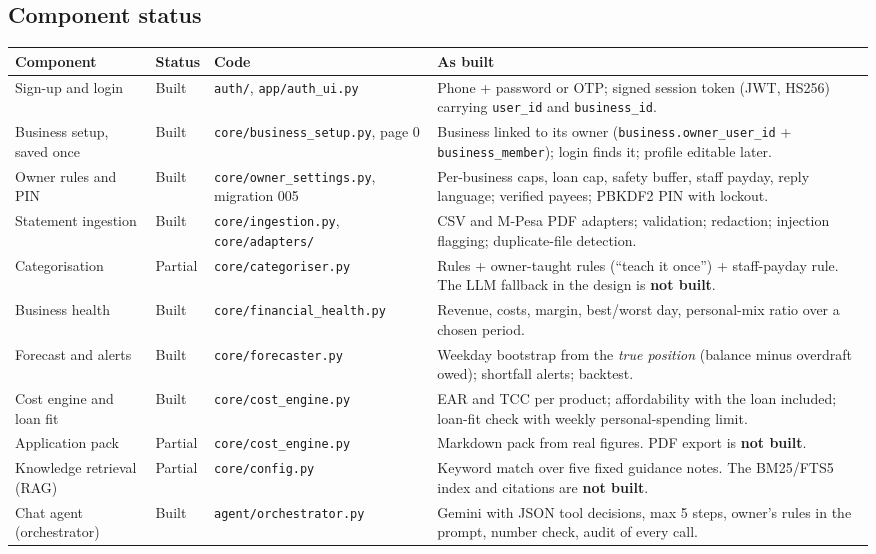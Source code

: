 \documentclass[10pt,a4paper]{article}
\newcommand{\code}[1]{\texttt{\small #1}}
\begin{document}
\subsection{Component status}
\begingroup\footnotesize
\begin{longtable}{@{}p{3.6cm}p{1.3cm}p{4.0cm}p{6.0cm}@{}}
\toprule
\textbf{Component} & \textbf{Status} & \textbf{Code} & \textbf{As built}\\
\midrule\endhead
Sign-up and login & Built & \code{auth/}, \code{app/auth\_ui.py} & Phone + password or OTP; signed session token (JWT, HS256) carrying \code{user\_id} and \code{business\_id}.\\
Business setup, saved once & Built & \code{core/business\_setup.py}, page 0 & Business linked to its owner (\code{business.owner\_user\_id} + \code{business\_member}); login finds it; profile editable later.\\
Owner rules and PIN & Built & \code{core/owner\_settings.py}, migration 005 & Per-business caps, loan cap, safety buffer, staff payday, reply language; verified payees; PBKDF2 PIN with lockout.\\
Statement ingestion & Built & \code{core/ingestion.py}, \code{core/adapters/} & CSV and M-Pesa PDF adapters; validation; redaction; injection flagging; duplicate-file detection.\\
Categorisation & Partial & \code{core/categoriser.py} & Rules + owner-taught rules (``teach it once'') + staff-payday rule. The LLM fallback in the design is \textbf{not built}.\\
Business health & Built & \code{core/financial\_health.py} & Revenue, costs, margin, best/worst day, personal-mix ratio over a chosen period.\\
Forecast and alerts & Built & \code{core/forecaster.py} & Weekday bootstrap from the \emph{true position} (balance minus overdraft owed); shortfall alerts; backtest.\\
Cost engine and loan fit & Built & \code{core/cost\_engine.py} & EAR and TCC per product; affordability with the loan included; loan-fit check with weekly personal-spending limit.\\
Application pack & Partial & \code{core/cost\_engine.py} & Markdown pack from real figures. PDF export is \textbf{not built}.\\
Knowledge retrieval (RAG) & Partial & \code{core/config.py} & Keyword match over five fixed guidance notes. The BM25/FTS5 index and citations are \textbf{not built}.\\
Chat agent (orchestrator) & Built & \code{agent/orchestrator.py} & Gemini with JSON tool decisions, max 5 steps, owner's rules in the prompt, number check, audit of every call.\\

\end{longtable}
\end{document}

